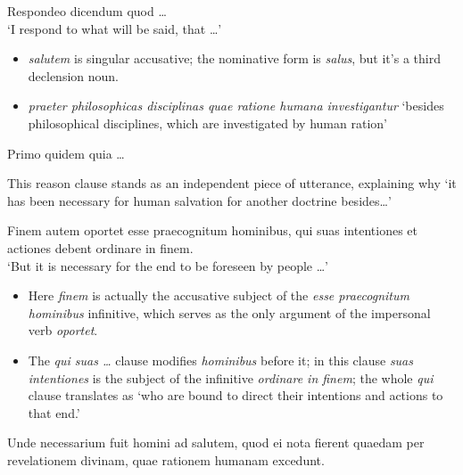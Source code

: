 \documentclass[a4paper, 12pt]{article}
\newcommand{\form}[1]{\emph{#1}}
\newcommand{\translate}[1]{`#1'}
\begin{document}
\begin{exe}
    \ex Respondeo dicendum quod \dots \\ 
    \translate{I respond to what will be said, that \dots}
\end{exe}

\begin{itemize}
    \item \form{salutem} is singular accusative; the nominative form is \form{salus}, 
    but it's a third declension noun.
    \item \form{praeter philosophicas disciplinas quae ratione humana investigantur} 
        \translate{besides philosophical disciplines, which are investigated by human ration}
\end{itemize}

\begin{exe}
    \ex Primo quidem quia \dots
\end{exe}

This reason clause stands as an independent piece of utterance, 
explaining why \translate{it has been necessary for human salvation for another doctrine besides\dots} 

\begin{exe}
    \ex Finem autem oportet esse praecognitum hominibus, qui suas intentiones et actiones debent ordinare in finem. \\
    \translate{But it is necessary for the end to be foreseen by people \dots}
\end{exe}

\begin{itemize}
    \item Here \form{finem} is actually the accusative subject of the 
        \form{esse praecognitum hominibus} infinitive,
        which serves as the only argument of the impersonal verb \form{oportet}.
    \item The \form{qui suas \dots} clause modifies \form{hominibus} before it;
        in this clause \form{suas intentiones} is the subject of the 
        infinitive \form{ordinare in finem}; 
        the whole \form{qui} clause translates as 
        \translate{who are bound to direct their intentions and actions to that end.}
\end{itemize}

\begin{exe}
    \ex Unde necessarium fuit homini ad salutem, quod ei nota fierent quaedam per revelationem divinam, quae rationem humanam excedunt. 
\end{exe}
\end{document}
